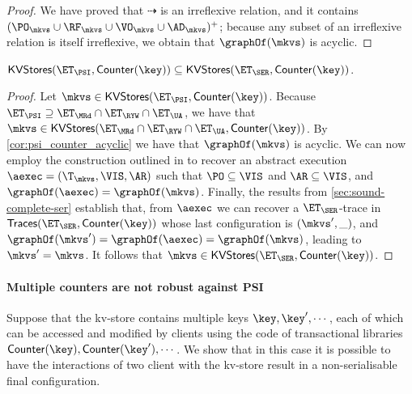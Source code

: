 \begin{proof}
We have proved that $\dashrightarrow$ is an irreflexive relation, and it contains $(\PO_{\mkvs} \cup \RF_{\mkvs} \cup \VO_{\mkvs} \cup \AD_{\mkvs})^+$; 
because any subset of an irreflexive relation is itself irreflexive, we obtain that $\graphOf(\mkvs)$ is acyclic.
\end{proof}

\begin{corollary}
$\mathsf{KVStores}(\ET_{\PSI}, \mathsf{Counter}(\key)) \subseteq \mathsf{KVStores}(\ET_{\SER}, \mathsf{Counter}(\key))$. 
\end{corollary}

\begin{proof}
Let $\mkvs \in \mathsf{KVStores}(\ET_{\PSI}, \mathsf{Counter}(\key))$. Because $\ET_{\PSI} \supseteq \ET_{\MRd} \cap \ET_{\RYW} \cap \ET_{\UA}$, 
we have that $\mkvs \in \mathsf{KVStores}(\ET_{\MRd} \cap \ET_{\RYW} \cap \ET_{\UA}, \mathsf{Counter}(\key))$. 
By \cref{cor:psi_counter_acyclic} we have that $\graphOf(\mkvs)$ is acyclic. We can now employ the construction 
outlined in \cite{laws} to recover an abstract execution $\aexec = (\T_{\mkvs}, \VIS, \AR)$ such that $\PO \subseteq \VIS$ and $\AR \subseteq \VIS$, 
and $\graphOf(\aexec) = \graphOf(\mkvs)$.
Finally, the results from \cref{sec:sound-complete-ser} establish that, from $\aexec$ we can recover a $\ET_{\SER}$-trace in 
$\mathsf{Traces}(\ET_{\SER}, \mathsf{Counter}(\key))$ 
whose last configuration is $(\mkvs', \_)$, and 
$\graphOf(\mkvs') = \graphOf(\aexec) = \graphOf(\mkvs)$, leading to $\mkvs' = \mkvs$. It follows that $\mkvs \in 
\mathsf{KVStores}(\ET_{\SER}, \mathsf{Counter}(\key))$.
\end{proof}

\paragraph{Multiple counters are not robust against PSI}
Suppose that the kv-store contains multiple keys $\key, \key', \cdots$, each of which 
can be accessed and modified by clients using the code of transactional libraries 
$\mathsf{Counter}(\key), \mathsf{Counter}(\key'), \cdots$. We show that in this
 case it is possible to have the interactions of two client with the kv-store result 
 in  a non-serialisable final configuration. 
 

